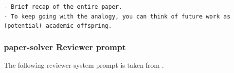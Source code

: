 \documentclass[11pt, a4paper]{gdm_format}
\begin{document}
\begin{tcolorbox}[breakable,colback=orange!5!white, colframe=orange!80!black, title=paper-solve Section Tip (Discussion)]
\texttt{- Brief recap of the entire paper.\\- To keep going with the analogy, you can think of future work as (potential) academic offspring.}
\end{tcolorbox}


\subsubsection{paper-solver Reviewer prompt}

The following reviewer system prompt is taken from \cite{lu2024aiscientist}.


\begin{tcolorbox}[breakable,colback=orange!5!white, colframe=orange!80!black, title=NeurIPS Reviewer System Prompt]

\end{tcolorbox}
\end{document}
